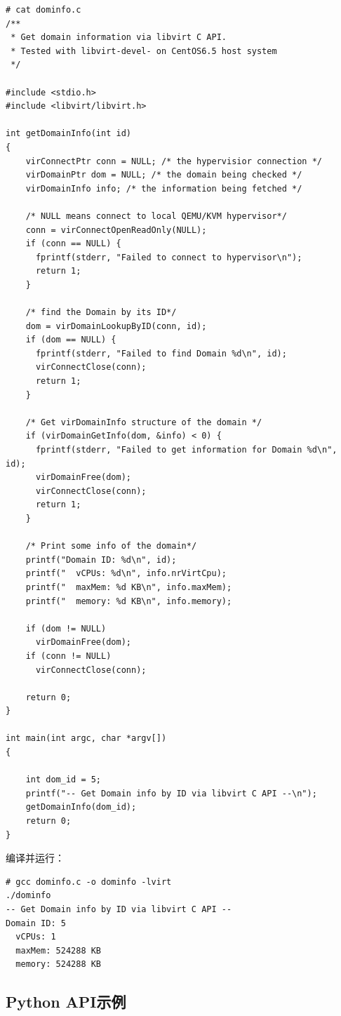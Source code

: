 \begin{verbatim}
# cat dominfo.c 
/**
 * Get domain information via libvirt C API.
 * Tested with libvirt-devel- on CentOS6.5 host system
 */

#include <stdio.h>
#include <libvirt/libvirt.h>

int getDomainInfo(int id)
{
    virConnectPtr conn = NULL; /* the hypervisior connection */
    virDomainPtr dom = NULL; /* the domain being checked */
    virDomainInfo info; /* the information being fetched */

    /* NULL means connect to local QEMU/KVM hypervisor*/
    conn = virConnectOpenReadOnly(NULL);
    if (conn == NULL) {
      fprintf(stderr, "Failed to connect to hypervisor\n");
      return 1;
    }

    /* find the Domain by its ID*/
    dom = virDomainLookupByID(conn, id);
    if (dom == NULL) {
      fprintf(stderr, "Failed to find Domain %d\n", id);
      virConnectClose(conn);
      return 1;
    }

    /* Get virDomainInfo structure of the domain */
    if (virDomainGetInfo(dom, &info) < 0) {
      fprintf(stderr, "Failed to get information for Domain %d\n", id);
      virDomainFree(dom);
      virConnectClose(conn);
      return 1;
    }

    /* Print some info of the domain*/
    printf("Domain ID: %d\n", id);
    printf("  vCPUs: %d\n", info.nrVirtCpu);
    printf("  maxMem: %d KB\n", info.maxMem);
    printf("  memory: %d KB\n", info.memory);

    if (dom != NULL)
      virDomainFree(dom);
    if (conn != NULL)
      virConnectClose(conn);

    return 0;
}

int main(int argc, char *argv[])
{

    int dom_id = 5;
    printf("-- Get Domain info by ID via libvirt C API --\n");
    getDomainInfo(dom_id);
    return 0;
}
\end{verbatim}

编译并运行：

\begin{verbatim}
# gcc dominfo.c -o dominfo -lvirt
./dominfo
-- Get Domain info by ID via libvirt C API --
Domain ID: 5
  vCPUs: 1
  maxMem: 524288 KB
  memory: 524288 KB
\end{verbatim}


\subsection{Python API示例}
\label{sec:libvirtPythonAPI}

